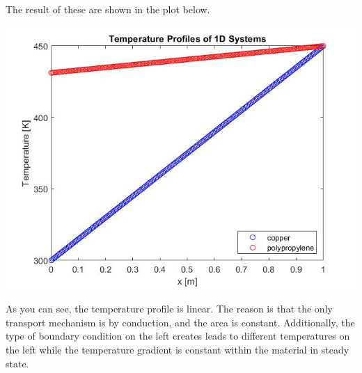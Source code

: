 \documentclass[11pt,a4paper]{article}
\numberwithin{equation}{section}
\begin{document}
The result of these are shown in the plot below.
\begin{center}
\includegraphics[scale=0.3]{plot.jpg}   
\end{center}

As you can see, the temperature profile is linear. The reason is that the only transport mechanism is by conduction, and the area is constant. Additionally, the type of boundary condition on the left creates leads to different temperatures on the left while the temperature gradient is constant within the material in steady state.
\end{document}
